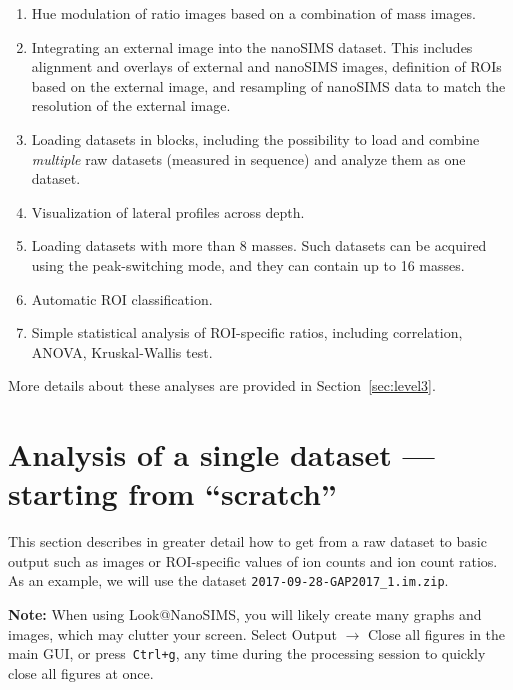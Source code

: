 \documentclass[a4paper, 11pt]{article}
\newcommand{\ttt}[1]{\texttt{#1}}
\newcommand{\lans}[1]{{\color{magenta}#1}}
\newcommand{\lanscb}[1]{{\color{darkgreen}#1}}
\newcommand{\lanstf}[1]{{\color{cyan}#1}}
\newcommand\ra{\rightarrow}
\newcommand\bb[1]{\textbf{#1}}
\begin{document}
\begin{enumerate}

\item \lanscb{Hue modulation} of ratio images based on a combination of mass images.

\item Integrating an \lans{external image} into the nanoSIMS dataset. This includes \lans{alignment} and \lans{overlays} of external and nanoSIMS images, definition of \lanstf{ROIs based on the external image}, and \lans{resampling} of nanoSIMS data to match the resolution of the external image.

\item Loading datasets in \lans{blocks}, including the possibility to load and combine \emph{multiple} raw datasets (measured in sequence) and analyze them as one dataset.

\item Visualization of \lanscb{lateral profiles across depth}.

\item Loading datasets with more than 8 masses. Such datasets can be acquired using the peak-switching mode, and they can contain up to 16 masses.

\item Automatic ROI classification.

\item Simple statistical analysis of ROI-specific ratios, including correlation, ANOVA, Kruskal-Wallis test.

\end{enumerate}
%
More details about these analyses are provided in Section~\ref{sec:level3}.


\section{Analysis of a single dataset --- starting from ``scratch''}
\label{sec:level1}

This section describes in greater detail how to get from a raw dataset to basic output such as images or ROI-specific values of ion counts and ion count ratios. As an example, we will use the dataset \ttt{2017-09-28-GAP2017\_1.im.zip}.

\bb{Note:} When using Look@NanoSIMS, you will likely create many graphs and images, which may clutter your screen. Select \lans{Output} $\ra$ \lans{Close all figures} in the main GUI, or press~\ttt{Ctrl+g}, any time during the processing session to quickly close all figures at once.
\end{document}
